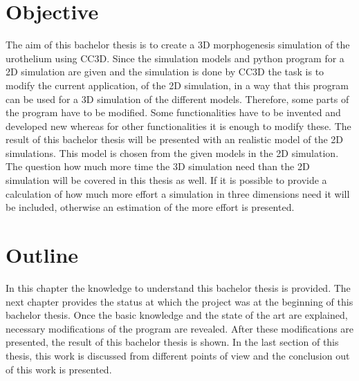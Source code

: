 \section{Objective}
The aim of this bachelor thesis is to create a 3D morphogenesis simulation of the urothelium using \ac{CC3D}. Since the simulation models and python program for a 2D simulation are given and the simulation is done by \ac{CC3D} the task is to modify the current application, of the 2D simulation, in a way that this program can be used for a 3D simulation of the different models. \newline
Therefore, some parts of the program have to be modified. Some functionalities have to be invented and developed new whereas for other functionalities it is enough to modify these. \newline
The result of this bachelor thesis will be presented with an realistic model of the 2D simulations. This model is chosen from the given models in the 2D simulation. The question how much more time the 3D simulation need than the 2D simulation will be covered in this thesis as well. If it is possible to provide a calculation of how much more effort a simulation in three dimensions need it will be included, otherwise an estimation of the more effort is presented.


\section{Outline}
In this chapter the knowledge to understand this bachelor thesis is provided. The next chapter provides the status at which the project was at the beginning of this bachelor thesis. Once the basic knowledge and the state of the art are explained, necessary modifications of the program are revealed. After these modifications are presented, the result of this bachelor thesis is shown. In the last section of this thesis, this work is discussed from different points of view and the conclusion out of this work is presented.